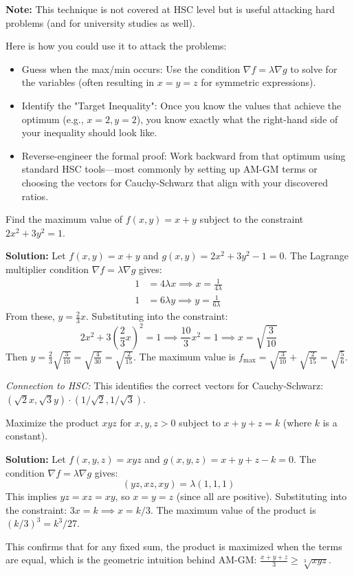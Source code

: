 \documentclass[12pt]{article}
\begin{document}
\textbf{Note:} This technique is not covered at HSC level but is useful attacking hard problems (and for university studies as well).

Here is how you could use it to attack the problems:

\begin{itemize}
  \item Guess when the max/min occurs: Use the condition $\nabla f = \lambda \nabla g$ to solve for the variables (often resulting in $x=y=z$ for symmetric expressions).
  \item Identify the "Target Inequality": Once you know the values that achieve the optimum (e.g., $x=2, y=2$), you know exactly what the right-hand side of your inequality should look like.
  \item Reverse-engineer the formal proof: Work backward from that optimum using standard HSC tools—most commonly by setting up AM-GM terms or choosing the vectors for Cauchy-Schwarz that align with your discovered ratios.
\end{itemize}

\begin{example}
Find the maximum value of $f(x,y) = x + y$ subject to the constraint $2x^2 + 3y^2 = 1$.

\textbf{Solution:}
Let $f(x,y) = x + y$ and $g(x,y) = 2x^2 + 3y^2 - 1 = 0$.
The Lagrange multiplier condition $\nabla f = \lambda \nabla g$ gives:
\begin{align*}
1 &= 4\lambda x \implies x = \frac{1}{4\lambda} \\
1 &= 6\lambda y \implies y = \frac{1}{6\lambda}
\end{align*}
From these, $y = \frac{2}{3}x$. Substituting into the constraint:
\[2x^2 + 3\left(\frac{2}{3}x\right)^2 = 1 \implies \frac{10}{3}x^2 = 1 \implies x = \sqrt{\frac{3}{10}}\]
Then $y = \frac{2}{3}\sqrt{\frac{3}{10}} = \sqrt{\frac{4}{30}} = \sqrt{\frac{2}{15}}$.
The maximum value is $f_{\max} = \sqrt{\frac{3}{10}} + \sqrt{\frac{2}{15}} = \sqrt{\frac{5}{6}}$.

\textit{Connection to HSC:} This identifies the correct vectors for Cauchy-Schwarz: $(\sqrt{2}x, \sqrt{3}y) \cdot (1/\sqrt{2}, 1/\sqrt{3})$.
\end{example}

\begin{example}
Maximize the product $xyz$ for $x, y, z > 0$ subject to $x + y + z = k$ (where $k$ is a constant).

\textbf{Solution:}
Let $f(x,y,z) = xyz$ and $g(x,y,z) = x + y + z - k = 0$.
The condition $\nabla f = \lambda \nabla g$ gives:
\[(yz, xz, xy) = \lambda(1, 1, 1)\]
This implies $yz = xz = xy$, so $x = y = z$ (since all are positive).
Substituting into the constraint: $3x = k \implies x = k/3$.
The maximum value of the product is $(k/3)^3 = k^3/27$.

This confirms that for any fixed sum, the product is maximized when the terms are equal, which is the geometric intuition behind AM-GM: $\frac{x+y+z}{3} \geq \sqrt[3]{xyz}$.
\end{example}
\end{document}

